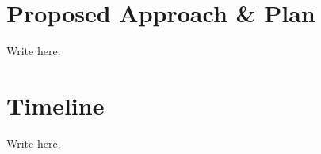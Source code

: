 \documentclass[11pt,letterpaper]{article}
\begin{document}
\section{Proposed Approach \& Plan}

Write here.


\section{Timeline}

Write here.




\end{document}
